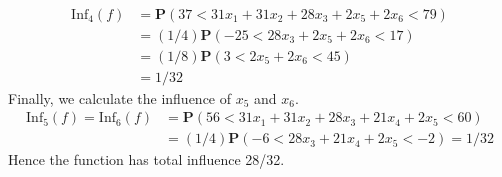 \begin{example}
\begin{align*}
    \end{align*}
    \begin{align*}
        \text{Inf}_4(f) &= \mathbf{P}(37 < 31x_1 + 31x_2 + 28x_3 + 2x_5 + 2x_6 < 79)\\
        &= (1/4) \mathbf{P}(-25 < 28x_3 + 2x_5 + 2x_6 < 17)\\
        &= (1/8) \mathbf{P}(3 < 2x_5 + 2x_6 < 45)\\
        &= 1/32
    \end{align*}
    Finally, we calculate the influence of $x_5$ and $x_6$.
    \begin{align*}
        \text{Inf}_5(f) = \text{Inf}_6(f) &= \mathbf{P}(56 < 31x_1 + 31x_2 + 28x_3 + 21x_4 + 2x_5 < 60)\\
        &= (1/4) \mathbf{P}(-6 < 28x_3 + 21x_4 + 2x_5 < -2) = 1/32
    \end{align*}
    Hence the function has total influence 28/32.
\end{example}

